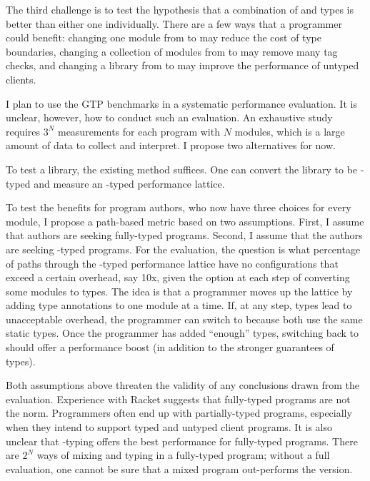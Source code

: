 The third challenge is to test the hypothesis that a combination of \tdeep{}
 and \tshallow{} types is better than either one individually.
There are a few ways that a programmer could benefit:
 changing one module from \tdeep{} to \tshallow{} may reduce the cost of type boundaries,
 changing a collection of modules from \tshallow{} to \tdeep{} may remove many tag checks,
 and changing a library from \tdeep{} to \tshallow{} may improve the performance of untyped clients.

I plan to use the GTP benchmarks in a systematic performance evaluation.
It is unclear, however, how to conduct such an evaluation.
An exhaustive study requires $3^N$ measurements for each program with $N$
 modules, which is a large amount of data to collect and interpret.
I propose two alternatives for now.

To test a library, the existing method suffices.
One can convert the library to be \tshallow{}-typed and measure an
 \tdeep{}-typed performance lattice.

To test the benefits for program authors, who now have three choices for every
module, I propose a path-based metric based on two assumptions.
First, I assume that authors are seeking fully-typed programs.
Second, I assume that the authors are seeking \tdeep{}-typed programs.
For the evaluation, the question is what percentage of paths through the \tdeep{}-typed performance
 lattice have no configurations that exceed a certain overhead, say 10x, given
 the option at each step of converting some modules to \tshallow{} types.
The idea is that a programmer moves up the lattice by adding type annotations
 to one module at a time.
If, at any step, \tdeep{} types lead to unacceptable overhead, the programmer can
 switch to \tshallow{} because both use the same static types.
Once the programmer has added ``enough'' types, switching back to \tdeep{} should
offer a performance boost (in addition to the stronger guarantees of \tdeep{} types).

Both assumptions above threaten the validity of any conclusions drawn from the
evaluation.
Experience with Racket suggests that fully-typed programs are not the norm.
Programmers often end up with partially-typed programs, especially when they
intend to support typed and untyped client programs.
It is also unclear that \tdeep{}-typing offers the best performance for fully-typed
programs.
There are $2^N$ ways of mixing \tdeep{} and \tshallow{} typing in a fully-typed program;
 without a full evaluation, one cannot be sure that a mixed program out-performs
 the \tdeep{} version.

